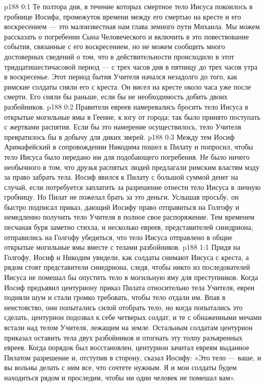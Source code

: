 \author{Комиссия срединников}
\vs p188 0:1 Те полтора дня, в течение которых смертное тело Иисуса покоилось в гробнице Иосифа, промежуток времени между его смертью на кресте и его воскресением --- это малоизвестная нам глава земного пути Михаила. Мы можем рассказать о погребении Сына Человеческого и включить в это повествование события, связанные с его воскресением, но не можем сообщить много достоверных сведений о том, что в действительности происходило в этот тридцатишестичасовой период --- с трех часов дня в пятницу до трех часов утра в воскресенье. Этот период бытия Учителя начался незадолго до того, как римские солдаты сняли его с креста. Он висел на кресте около часа уже после смерти. Его сняли бы раньше, если бы не необходимость добить двоих разбойников.
\vs p188 0:2 Правители евреев намеревались бросить тело Иисуса в открытые могильные ямы в Геенне, к югу от города; так было принято поступать с жертвами распятия. Если бы это намерение осуществилось, тело Учителя превратилось бы в добычу для диких зверей.
\vs p188 0:3 Между тем Иосиф Аримафейский в сопровождении Никодима пошел к Пилату и попросил, чтобы тело Иисуса было передано им для подобающего погребения. Не было ничего необычного в том, что друзья распятых людей предлагали римским властям мзду за право забрать тела. Иосиф явился к Пилату с большой суммой денег на случай, если потребуется заплатить за разрешение отнести тело Иисуса в личную гробницу. Но Пилат не пожелал брать за это деньги. Услышав просьбу, он быстро подписал приказ, дающий Иосифу право отправиться на Голгофу и немедленно получить тело Учителя в полное свое распоряжение. Тем временем песчаная буря заметно стихла, и несколько евреев, представителей синедриона, отправились на Голгофу убедиться, что тело Иисуса отправлено в общие открытые могильные ямы вместе с телами разбойников.
\vs p188 1:1 Придя на Голгофу, Иосиф и Никодим увидели, как солдаты снимают Иисуса с креста, а рядом стоят представители синедриона, следя, чтобы никто из последователей Иисуса не помешал бы опустить тело в могильную яму для преступников. Когда Иосиф предъявил центуриону приказ Пилата относительно тела Учителя, евреи подняли шум и стали громко требовать, чтобы тело отдали им. Впав в неистовство, они попытались силой отобрать тело, но когда попытались это сделать, центурион подозвал к себе четверых солдат, и те с обнаженными мечами встали над телом Учителя, лежащим на земле. Остальным солдатам центурион приказал оставить тела двух разбойников и отогнать эту толпу разъяренных евреев. Когда порядок был восстановлен, центурион зачитал евреям выданное Пилатом разрешение и, отступив в сторону, сказал Иосифу: «Это тело --- ваше, и вы вольны делать с ним все, что сочтете нужным. Я и мои солдаты будем находиться рядом и проследим, чтобы ни один человек не помешал вам».
